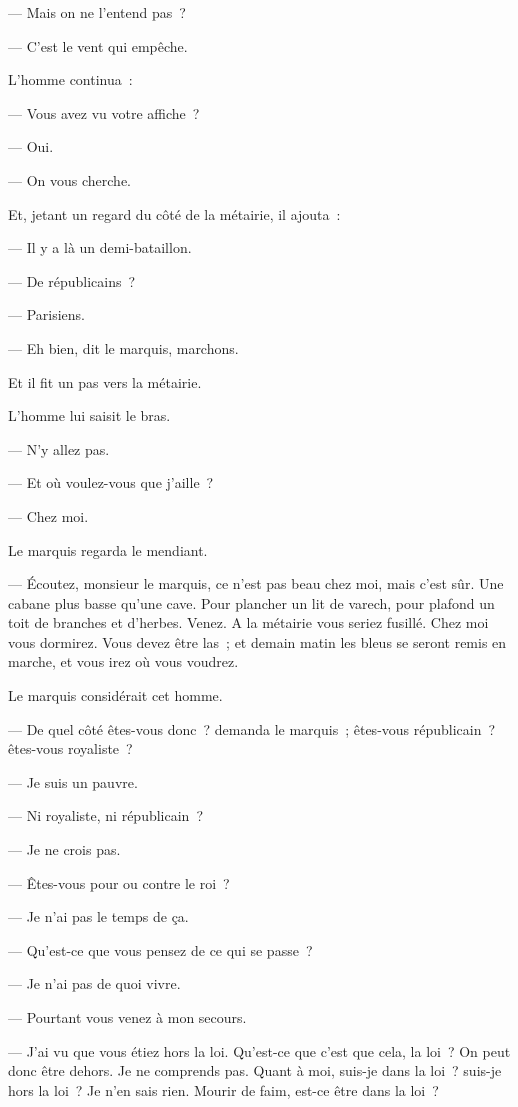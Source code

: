 \documentclass[french,twoside]{book} %
\begin{document}
— Mais on ne l’entend pas ?\par
— C’est le vent qui empêche.\par
L’homme continua :\par
— Vous avez vu votre affiche ?\par
— Oui.\par
— On vous cherche.\par
Et, jetant un regard du côté de la métairie, il ajouta :\par
— Il y a là un demi-bataillon.\par
— De républicains ?\par
— Parisiens.\par
— Eh bien, dit le marquis, marchons.\par
Et il fit un pas vers la métairie.\par
L’homme lui saisit le bras.\par
 — N’y allez pas.\par
— Et où voulez-vous que j’aille ?\par
— Chez moi.\par
Le marquis regarda le mendiant.\par
— Écoutez, monsieur le marquis, ce n’est pas beau chez moi, mais c’est sûr. Une cabane plus basse qu’une cave. Pour plancher un lit de varech, pour plafond un toit de branches et d’herbes. Venez. A la métairie vous seriez fusillé. Chez moi vous dormirez. Vous devez être las ; et demain matin les bleus se seront remis en marche, et vous irez où vous voudrez.\par
Le marquis considérait cet homme.\par
— De quel côté êtes-vous donc ? demanda le marquis ; êtes-vous républicain ? êtes-vous royaliste ?\par
— Je suis un pauvre.\par
— Ni royaliste, ni républicain ?\par
— Je ne crois pas.\par
— Êtes-vous pour ou contre le roi ?\par
— Je n’ai pas le temps de ça.\par
— Qu’est-ce que vous pensez de ce qui se passe ?\par
— Je n’ai pas de quoi vivre.\par
— Pourtant vous venez à mon secours.\par
— J’ai vu que vous étiez hors la loi. Qu’est-ce que c’est que cela, la loi ? On peut donc être dehors. Je ne comprends pas. Quant à moi, suis-je dans la loi ? suis-je hors la loi ? Je n’en sais rien. Mourir de faim, est-ce être dans la loi ?\par
\end{document}
